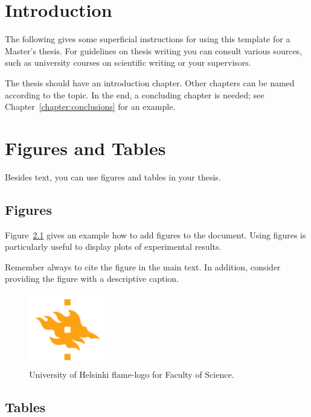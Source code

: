 \chapter{Introduction}

The following gives some superficial instructions for using this template for a Master's thesis. For guidelines on thesis writing you can consult various sources, such as university courses on scientific writing or your supervisors.

The thesis should have an introduction chapter. Other chapters can be named according to the topic. In the end, a concluding chapter is needed; see Chapter~\ref{chapter:conclusions} for an example.

\chapter{Figures and Tables}

Besides text, you can use figures and tables in your thesis.

\section{Figures}
Figure~\ref{fig:logo} gives an example how to add figures to the document. 
%
Using figures is particularly useful to display plots of experimental results.

Remember always to cite the figure in the main text. In addition, consider providing the figure with a descriptive caption.

\begin{figure}[h!] 
\begin{center}
\includegraphics[width=0.3\textwidth]{HY-logo-ml.png}
\caption{University of Helsinki flame-logo for Faculty of Science.\label{fig:logo}}
\end{center}
\end{figure}

\section{Tables}

